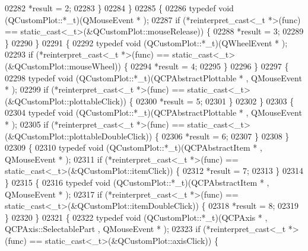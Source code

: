 \begin{DoxyCode}
02282                 *result = 2;
02283             \}
02284         \}
02285         \{
02286             \textcolor{keyword}{typedef} void (QCustomPlot::*\_t)(QMouseEvent * );
02287             \textcolor{keywordflow}{if} (*reinterpret\_cast<\_t *>(func) == \textcolor{keyword}{static\_cast<}\_t\textcolor{keyword}{>}(&QCustomPlot::mouseRelease)) \{
02288                 *result = 3;
02289             \}
02290         \}
02291         \{
02292             \textcolor{keyword}{typedef} void (QCustomPlot::*\_t)(QWheelEvent * );
02293             \textcolor{keywordflow}{if} (*reinterpret\_cast<\_t *>(func) == \textcolor{keyword}{static\_cast<}\_t\textcolor{keyword}{>}(&QCustomPlot::mouseWheel)) \{
02294                 *result = 4;
02295             \}
02296         \}
02297         \{
02298             \textcolor{keyword}{typedef} void (QCustomPlot::*\_t)(QCPAbstractPlottable * , QMouseEvent * );
02299             \textcolor{keywordflow}{if} (*reinterpret\_cast<\_t *>(func) == \textcolor{keyword}{static\_cast<}\_t\textcolor{keyword}{>}(&QCustomPlot::plottableClick)) \{
02300                 *result = 5;
02301             \}
02302         \}
02303         \{
02304             \textcolor{keyword}{typedef} void (QCustomPlot::*\_t)(QCPAbstractPlottable * , QMouseEvent * );
02305             \textcolor{keywordflow}{if} (*reinterpret\_cast<\_t *>(func) == \textcolor{keyword}{static\_cast<}\_t\textcolor{keyword}{>}(&QCustomPlot::plottableDoubleClick)) \{
02306                 *result = 6;
02307             \}
02308         \}
02309         \{
02310             \textcolor{keyword}{typedef} void (QCustomPlot::*\_t)(QCPAbstractItem * , QMouseEvent * );
02311             \textcolor{keywordflow}{if} (*reinterpret\_cast<\_t *>(func) == \textcolor{keyword}{static\_cast<}\_t\textcolor{keyword}{>}(&QCustomPlot::itemClick)) \{
02312                 *result = 7;
02313             \}
02314         \}
02315         \{
02316             \textcolor{keyword}{typedef} void (QCustomPlot::*\_t)(QCPAbstractItem * , QMouseEvent * );
02317             \textcolor{keywordflow}{if} (*reinterpret\_cast<\_t *>(func) == \textcolor{keyword}{static\_cast<}\_t\textcolor{keyword}{>}(&QCustomPlot::itemDoubleClick)) \{
02318                 *result = 8;
02319             \}
02320         \}
02321         \{
02322             \textcolor{keyword}{typedef} void (QCustomPlot::*\_t)(QCPAxis * , QCPAxis::SelectablePart , QMouseEvent * );
02323             \textcolor{keywordflow}{if} (*reinterpret\_cast<\_t *>(func) == \textcolor{keyword}{static\_cast<}\_t\textcolor{keyword}{>}(&QCustomPlot::axisClick)) \{

\end{DoxyCode}
